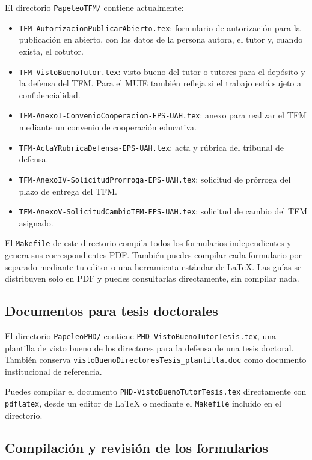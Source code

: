 El directorio \texttt{PapeleoTFM/} contiene actualmente:

\begin{itemize}
  \item \texttt{TFM-AutorizacionPublicarAbierto.tex}: formulario de autorización para la publicación en abierto, con los datos de la persona autora, el tutor y, cuando exista, el cotutor.
  \item \texttt{TFM-VistoBuenoTutor.tex}: visto bueno del tutor o tutores para el depósito y la defensa del TFM. Para el MUIE también refleja si el trabajo está sujeto a confidencialidad.
  \item \texttt{TFM-AnexoI-ConvenioCooperacion-EPS-UAH.tex}: anexo para realizar el TFM mediante un convenio de cooperación educativa.
  \item \texttt{TFM-ActaYRubricaDefensa-EPS-UAH.tex}: acta y rúbrica del tribunal de defensa.
  \item \texttt{TFM-AnexoIV-SolicitudProrroga-EPS-UAH.tex}: solicitud de prórroga del plazo de entrega del TFM.
  \item \texttt{TFM-AnexoV-SolicitudCambioTFM-EPS-UAH.tex}: solicitud de cambio del TFM asignado.
\end{itemize}

El \texttt{Makefile} de este directorio compila todos los formularios independientes y genera sus correspondientes PDF. También puedes compilar cada formulario por separado mediante tu editor o una herramienta estándar de \LaTeX{}. Las guías se distribuyen solo en PDF y puedes consultarlas directamente, sin compilar nada.

\subsection{Documentos para tesis doctorales}

El directorio \texttt{PapeleoPHD/} contiene \texttt{PHD-VistoBuenoTutorTesis.tex}, una plantilla de visto bueno de los directores para la defensa de una tesis doctoral. También conserva \texttt{vistoBuenoDirectoresTesis\_plantilla.doc} como documento institucional de referencia.

Puedes compilar el documento \texttt{PHD-VistoBuenoTutorTesis.tex} directamente con \texttt{pdflatex}, desde un editor de \LaTeX{} o mediante el \texttt{Makefile} incluido en el directorio.

\subsection{Compilación y revisión de los formularios}

